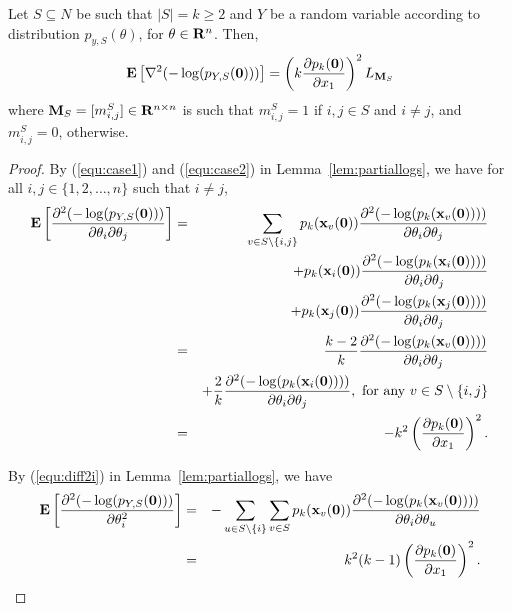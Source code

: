 \begin{lemma} Let $S\subseteq N$ be such that $|S| = k\geq 2$ and $Y$ be a random variable according to distribution $p_{y,S}(\theta)$, for $\theta \in \mathbf{R}^n$. Then, 
$$
\mathbf{E}\left[\nabla^2(-\log(p_{Y,S}(\mathbf{0})))\right] =  \left(k\frac{\partial p_k(\mathbf{0})}{\partial x_1}\right)^2 L_{\mathbf{M}_S}
$$
where $\mathbf{M}_S = [m_{i,j}^S]\in \mathbf{R}^{n\times n}$ is such that $m_{i,j}^S = 1$ if $i,j\in S$ and $i\neq j$, and $m_{i,j}^S = 0 $, otherwise.
\label{lem:explog}
\end{lemma}

\begin{proof} By (\ref{equ:case1}) and (\ref{equ:case2}) in Lemma~\ref{lem:partiallogs}, we have for all $i,j\in \{1,2,\ldots,n\}$ such that $i\neq j$,
\begin{eqnarray}
\mathbf{E}\left[\frac{\partial^2 (-\log(p_{Y,S}(\mathbf{0})))}{\partial\theta_i \partial \theta_j}\right] 
&=&  \sum_{v\in S\setminus \{i,j\}} p_k(\mathbf{x}_v(\mathbf{0})) \frac{\partial^2 (-\log(p_k(\mathbf{x}_v(\mathbf{0}))))}{\partial \theta_i \partial \theta_j}\nonumber\\
&& + p_k(\mathbf{x}_i(\mathbf{0})) \frac{\partial^2 (-\log(p_k(\mathbf{x}_i(\mathbf{0}))))}{\partial \theta_i \partial \theta_j} \nonumber\\
&& + p_k(\mathbf{x}_j(\mathbf{0})) \frac{\partial^2 (-\log(p_k(\mathbf{x}_j(\mathbf{0}))))}{\partial \theta_i \partial \theta_j} \nonumber\\
&=& \frac{k-2}{k}\frac{\partial^2 (-\log(p_k(\mathbf{x}_v(\mathbf{0}))))}{\partial \theta_i \partial \theta_j} \nonumber \\
&& + \frac{2}{k}\frac{\partial^2 (-\log(p_k(\mathbf{x}_i(\mathbf{0}))))}{\partial \theta_i \partial \theta_j}, \hbox{ for any } v \in S\setminus\{i,j\}\nonumber\\
&=& -k^2 \left(\frac{\partial p_k(\mathbf{0})}{\partial x_1}\right)^2.\label{equ:gijdiff}
\end{eqnarray}

By (\ref{equ:diff2i}) in Lemma~\ref{lem:partiallogs}, we have
\begin{eqnarray*}
\mathbf{E}\left[\frac{\partial^2 (-\log(p_{Y,S}(\mathbf{0})))}{\partial\theta_i^2}\right] &=& -\sum_{u\in S\setminus \{i\}} \sum_{v\in S} p_k(\mathbf{x}_v(\mathbf{0}))\frac{\partial^2 (-\log(p_k(\mathbf{x}_v(\mathbf{0}))))}{\partial \theta_i\partial \theta_u}\\ 
&=& k^2(k-1) \left(\frac{\partial p_k(\mathbf{0})}{\partial x_1}\right)^2.
\end{eqnarray*}
\end{proof}

